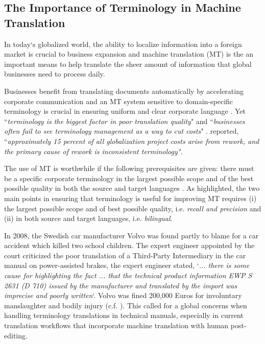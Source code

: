 \newpage
\subsection{The Importance of Terminology in Machine Translation}

In today`s globalized world, the ability to localize information into a foreign market is crucial to business expansion and machine translation (MT) is the an important means to help translate the sheer amount of information that global businesses need to process daily.

Businesses benefit from translating documents automatically by accelerating corporate communication and an MT system sensitive to domain-specific terminology is crucial in ensuring uniform and clear corporate language \citep{porsiel2011}. Yet ``\emph{terminology is the biggest factor in poor translation quality}" \citep{warburton2005} and ``\emph{businesses often fail to see terminology management as a way to cut costs}" \citep{clientsidenews2006}. \cite{lionbridge2010} reported, ``\emph{approximately 15 percent of all globalization project costs arise from rework, and the primary cause of rework is inconsistent terminology".}

The use of MT is worthwhile if the following prerequisites are given: there must be a specific corporate terminology in the largest possible scope and of the best possible quality in both the source and target languages \citep{porsiel2008}.  As highlighted, the two main points in ensuring that terminology is useful for improving MT requires (i) the largest possible scope and of best possible quality, i.e. \emph{recall and precision} and (ii) in both source and target languages, i.e. \emph{bilingual}.  

In 2008, the Swedish car manufacturer Volvo was found partly to blame for a car accident which killed two school children. The expert engineer appointed by the court criticized the poor translation of a Third-Party Intermediary in the car manual on power-assisted brakes, the expert engineer stated, `\emph{... there is some cause for highlighting the fact ... that the technical product information EWP S 2631 (D 710) issued by the manufacturer and translated by the import was imprecise and poorly written}`. Volvo was fined 200,000 Euros for involuntary manslaughter and bodily injury (c.f. \citealp{hoffmeister2014}). This called for a global concerns when handling terminology translations in technical manuals, especially in current translation workflows that incorporate machine translation with human post-editing. 

